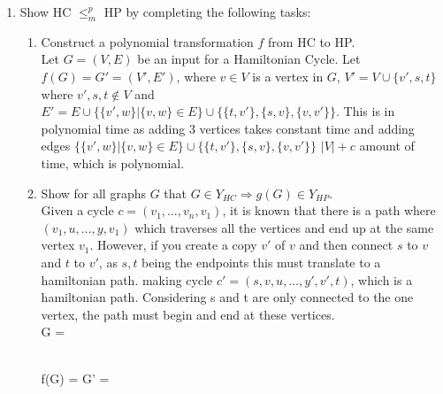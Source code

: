 \documentclass[11pt,a4paper]{article}
\newcommand{\hc} {HC}
\newcommand{\hp} {HP}
\begin{document}
\begin{enumerate}
\begin{enumerate}
            
        \end{enumerate}
    \item Show \hc{} $\leq^p_m$ \hp{} by completing the following tasks: 
    \begin{enumerate}
        \item Construct a polynomial transformation $f$ from \hc{} to \hp{}.\\
        Let $G = (V, E)$ be an input for a Hamiltonian Cycle. Let $f(G) = G'  = (V', E')$,
             where $v \in V$ is a vertex in $G$, $V' = V \cup \{v', s, t\}$  where $v', s, t \notin V$ and $E' = E \cup \{ \{v',w\} | \{v, w\} \in E \} \cup \{ \{ t, v' \}, \{s, v\}, \{v, v'\} \}$.
             This is in polynomial time as adding 3 vertices takes constant time and adding edges $\{ \{v',w\} | \{v, w\} \in E \} \cup \{ \{ t, v' \}, \{s, v\}, \{v, v'\} \}$
            $|V| + c$ amount of time, which is polynomial. 
        \item Show for all graphs $G$ that $G \in Y_{\hc{}} \Rightarrow g(G) \in Y_{\hp{}}$.\\
        Given a cycle $c = (v_1, \ldots, v_n, v_1)$, it is known that there is a path where $(v_1, u, \dots, y, v_1)$ which traverses all the vertices and end up at the same vertex $v_1$.
         However, if you create a copy $v'$ of $v$ and then connect $s$ to $v$ and $t$ to $v'$, as $s, t$ being the endpoints this must translate to a hamiltonian path.
         making cycle $c' = (s,v,u,\ldots , y', v', t)$, which is a hamiltonian path. Considering s and t are only connected to the one vertex, the path must begin and end at these vertices.\\

         G = \\
         \\

        f(G) = G' = \\
\end{enumerate}
\end{enumerate}
\end{document}
